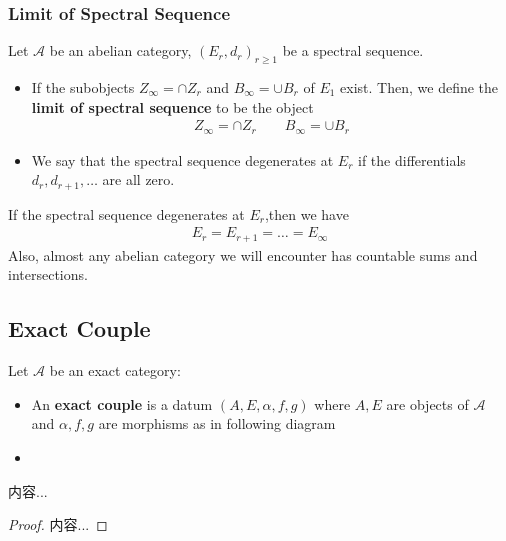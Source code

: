 \documentclass[Total.tex]{subfiles}
\begin{document}
			\subsubsection{Limit of Spectral Sequence}
			\begin{Def}
				Let $\mathcal{A}$ be an abelian category, $(E_r,d_r)_{r\geq 1}$ be a spectral sequence.
				\begin{itemize}
					\item If the subobjects $Z_\infty=\cap Z_r$ and $B_\infty=\cup B_r$ of $E_1$ exist. Then, we define the \textbf{limit of spectral sequence} to be the object
					\begin{gather*}
						Z_\infty=\cap Z_r\qquad B_\infty=\cup B_r
					\end{gather*}
					\item We say that the spectral sequence degenerates at $E_r$ if the differentials $d_r,d_{r+1},\dots$ are all zero.
				\end{itemize}
			\end{Def}
			If the spectral sequence degenerates at $E_r$,then we have
			\begin{gather*}
				E_r=E_{r+1}=\dots=E_\infty
			\end{gather*}
			Also, almost any abelian category we
			will encounter has countable sums and intersections.
			
			\subsection{Exact Couple}
			\begin{Def}
				Let $\mathcal{A}$ be an exact category:
				\begin{itemize}
					\item An \textbf{exact couple} is a datum $(A,E,\alpha,f,g)$ where $A,E$ are objects of $\mathcal{A}$ and $\alpha,f,g$ are morphisms as in following diagram
					\begin{center}
					\end{center}
					\item 
				\end{itemize}
			\end{Def}
			\begin{lemma}
				内容...
			\end{lemma}
			\begin{proof}
				内容...
			\end{proof}
\end{document}

